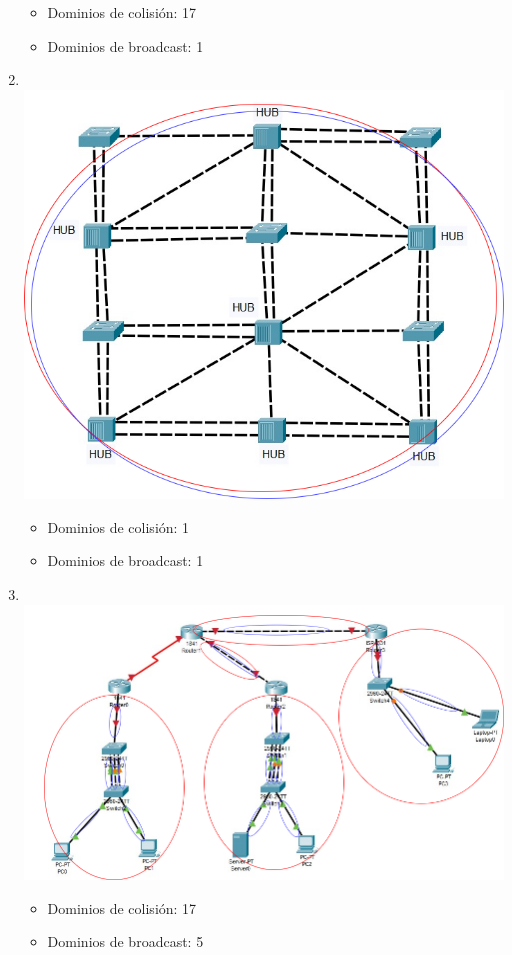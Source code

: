 \documentclass{article}
\begin{document}
\begin{enumerate}[label=\textbf{\arabic*.}]
    \begin{itemize}
        \item Dominios de colisión: 17
        \item Dominios de broadcast: 1
    \end{itemize}
    \item \textbf{}\\ \includegraphics[width=14.6cm]{top04-res}
    \begin{itemize}
        \item Dominios de colisión: 1
        \item Dominios de broadcast: 1
    \end{itemize}    
    \item \textbf{}\\ \includegraphics[width=14.4cm]{top05-res}
    \begin{itemize}
        \item Dominios de colisión: 17
        \item Dominios de broadcast: 5
    \end{itemize}    
\end{enumerate}
\end{document}
